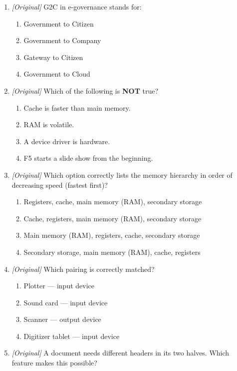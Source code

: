 \documentclass[11pt]{article}
\begin{document}
\begin{enumerate}[label=\textbf{Q\arabic*.}, leftmargin=*]
\begin{enumerate}[label=\Alph*.]
  \end{enumerate}
\item \textit{[Original]} G2C in e-governance stands for:
  \begin{enumerate}[label=\Alph*.]
    \item Government to Citizen
    \item Government to Company
    \item Gateway to Citizen
    \item Government to Cloud
  \end{enumerate}
\item \textit{[Original]} Which of the following is \textbf{NOT} true?
  \begin{enumerate}[label=\Alph*.]
    \item Cache is faster than main memory.
    \item RAM is volatile.
    \item A device driver is hardware.
    \item F5 starts a slide show from the beginning.
  \end{enumerate}
\item \textit{[Original]} Which option correctly lists the memory hierarchy in
  order of decreasing speed (fastest first)?
  \begin{enumerate}[label=\Alph*.]
    \item Registers, cache, main memory (RAM), secondary storage
    \item Cache, registers, main memory (RAM), secondary storage
    \item Main memory (RAM), registers, cache, secondary storage
    \item Secondary storage, main memory (RAM), cache, registers
  \end{enumerate}
\item \textit{[Original]} Which pairing is correctly matched?
  \begin{enumerate}[label=\Alph*.]
    \item Plotter --- input device
    \item Sound card --- input device
    \item Scanner --- output device
    \item Digitizer tablet --- input device
  \end{enumerate}
\item \textit{[Original]} A document needs different headers in its two
  halves. Which feature makes this possible?
  \begin{enumerate}[label=\Alph*.]

\end{enumerate}
\end{enumerate}
\end{document}
